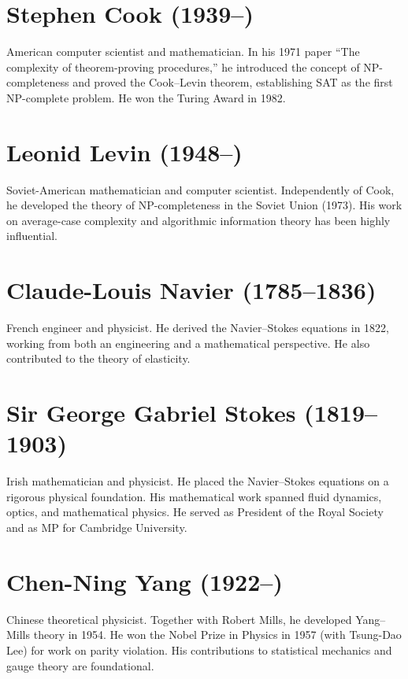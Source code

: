 \section*{Stephen Cook (1939--)}

American computer scientist and mathematician. In his 1971 paper ``The complexity of theorem-proving procedures,'' he introduced the concept of NP-completeness and proved the Cook--Levin theorem, establishing SAT as the first NP-complete problem. He won the Turing Award in 1982.

\section*{Leonid Levin (1948--)}

Soviet-American mathematician and computer scientist. Independently of Cook, he developed the theory of NP-completeness in the Soviet Union (1973). His work on average-case complexity and algorithmic information theory has been highly influential.

\section*{Claude-Louis Navier (1785--1836)}

French engineer and physicist. He derived the Navier--Stokes equations in 1822, working from both an engineering and a mathematical perspective. He also contributed to the theory of elasticity.

\section*{Sir George Gabriel Stokes (1819--1903)}

Irish mathematician and physicist. He placed the Navier--Stokes equations on a rigorous physical foundation. His mathematical work spanned fluid dynamics, optics, and mathematical physics. He served as President of the Royal Society and as MP for Cambridge University.

\section*{Chen-Ning Yang (1922--)}

Chinese theoretical physicist. Together with Robert Mills, he developed Yang--Mills theory in 1954. He won the Nobel Prize in Physics in 1957 (with Tsung-Dao Lee) for work on parity violation. His contributions to statistical mechanics and gauge theory are foundational.

